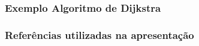 \documentclass{beamer}
\begin{document}
\begin{frame}
  \frametitle{Exemplo Algoritmo de Dijkstra}
  
\end{frame}

\begin{frame}
  \frametitle{Referências utilizadas na apresentação}
  
\end{frame}
\end{document}

